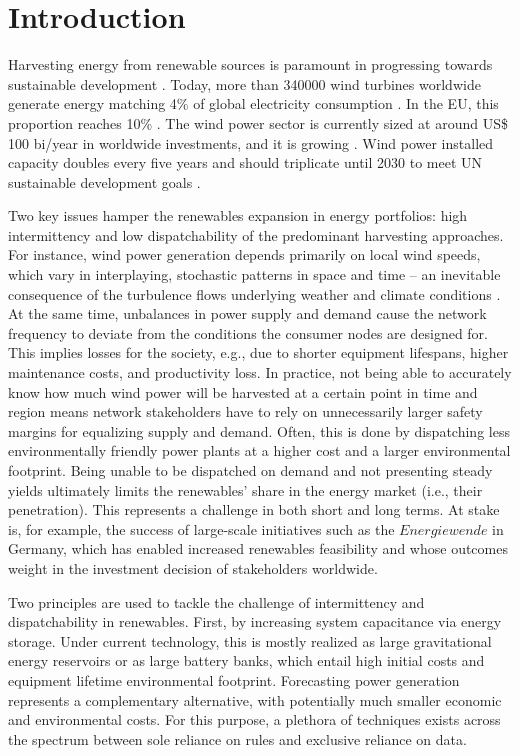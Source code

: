 \chapter{Introduction}
Harvesting energy from renewable sources is paramount in progressing towards sustainable development \cite{un2020sdgs}.
Today, more than 340000 wind turbines worldwide generate energy matching 4\% of global electricity consumption \cite{gwec2017numbers}.
In the EU, this proportion reaches 10\% \cite{gwec2017numbers}.
The wind power sector is currently sized at around US\$ 100 bi/year in worldwide investments, and it is growing \cite{update2017global}.
Wind power installed capacity doubles every five years and should triplicate until 2030 to meet UN sustainable development goals \cite{gwec2017numbers}.

Two key issues hamper the renewables expansion in energy portfolios: high intermittency and low dispatchability of the predominant harvesting approaches.
For instance, wind power generation depends primarily on local wind speeds, which vary in interplaying, stochastic patterns in space and time – an inevitable consequence of the turbulence flows underlying weather and climate conditions \cite{pope2001turbulent}.
At the same time, unbalances in power supply and demand cause the network frequency to deviate from the conditions the consumer nodes are designed for.
This implies losses for the society, e.g., due to shorter equipment lifespans, higher maintenance costs, and productivity loss.
In practice, not being able to accurately know how much wind power will be harvested at a certain point in time and region means network stakeholders have to rely on unnecessarily larger safety margins for equalizing supply and demand.
Often, this is done by dispatching less environmentally friendly power plants at a higher cost and a larger environmental footprint.
Being unable to be dispatched on demand and not presenting steady yields ultimately limits the renewables' share in the energy market (i.e., their penetration).
This represents a challenge in both short and long terms.
At stake is, for example, the success of large-scale initiatives such as the $\textit{Energiewende}$ in Germany, which has enabled increased renewables feasibility and whose outcomes weight in the investment decision of stakeholders worldwide.

Two principles are used to tackle the challenge of intermittency and dispatchability in renewables.
First, by increasing system capacitance via energy storage.
Under current technology, this is mostly realized as large gravitational energy reservoirs or as large battery banks, which entail high initial costs and equipment lifetime environmental footprint.
Forecasting power generation represents a complementary alternative, with potentially much smaller economic and environmental costs.
For this purpose, a plethora of techniques exists across the spectrum between sole reliance on rules and exclusive reliance on data.

